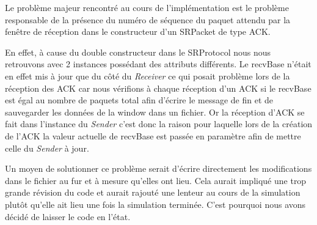 \documentclass[../rapport.tex]{subfiles}
\begin{document}
Le problème majeur rencontré au cours de l'implémentation est le problème responsable de la 
présence du numéro de séquence du paquet attendu par la fenêtre de réception dans le constructeur
d'un SRPacket de type ACK. 

\medskip

En effet, à cause du double constructeur dans le SRProtocol nous nous retrouvons avec 2 instances
possédant des attributs différents. Le recvBase n'était en effet mis à jour que du côté du
\textit{Receiver} ce qui posait problème lors de la réception des ACK car nous vérifions
à chaque réception d'un ACK si le recvBase est égal au nombre de paquets total afin d'écrire
le message de fin et de sauvegarder les données de la window dans un fichier. Or la réception
d'ACK se fait dans l'instance du \textit{Sender} c'est donc la raison pour laquelle lors de la 
création de l'ACK la valeur actuelle de recvBase est passée en paramètre afin de mettre celle
du \textit{Sender} à jour. 

\medskip

Un moyen de solutionner ce problème serait d'écrire directement les modifications dans le 
fichier au fur et à mesure qu'elles ont lieu. Cela aurait impliqué une trop grande révision du
code et aurait rajouté une lenteur au cours de la simulation plutôt qu'elle ait lieu une fois la 
simulation terminée. C'est pourquoi nous avons décidé de laisser le code en l'état. 
\end{document}
